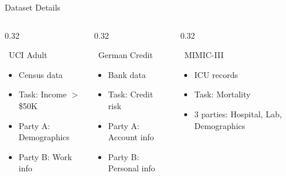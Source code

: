 \documentclass[aspectratio=169, 11pt]{beamer}
\begin{document}
\begin{frame}{Dataset Details}
    \begin{columns}[T]
        \begin{column}{0.32\textwidth}
            \begin{block}{\faPeopleArrows\ UCI Adult}
                \begin{itemize}
                    \item Census data
                    \item Task: Income $>$\$50K
                    \item Party A: Demographics
                    \item Party B: Work info
                \end{itemize}
            \end{block}
        \end{column}
        
        \begin{column}{0.32\textwidth}
            \begin{block}{\faCreditCard\ German Credit}
                \begin{itemize}
                    \item Bank data
                    \item Task: Credit risk
                    \item Party A: Account info
                    \item Party B: Personal info
                \end{itemize}
            \end{block}
        \end{column}
        
        \begin{column}{0.32\textwidth}
            \begin{block}{\faHospital\ MIMIC-III}
                \begin{itemize}
                    \item ICU records
                    \item Task: Mortality
                    \item 3 parties: Hospital, Lab, Demographics
                \end{itemize}
            \end{block}
        \end{column}
    \end{columns}
\end{frame}
\end{document}
